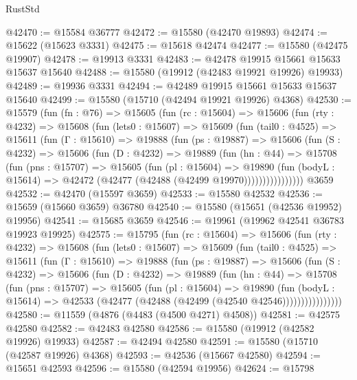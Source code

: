 \begin{lexlean}{RustStd}
\begin{coremodule}
@42470 := @15584 @36777
@42472 := @15580 (@42470 @19893)
@42474 := @15622 (@15623 @3331)
@42475 := @15618 @42474
@42477 := @15580 (@42475 @19907)
@42478 := @19913 @3331
@42483 := @42478 @19915 @15661 @15633 @15637 @15640
@42488 := @15580 (@19912 (@42483 @19921 @19926) @19933)
@42489 := @19936 @3331
@42494 := @42489 @19915 @15661 @15633 @15637 @15640
@42499 := @15580 (@15710 (@42494 @19921 @19926) @4368)
@42530 := @15579
    (fun (fn : @76) =>
    @15605
      (fun (rc : @15604) =>
      @15606
        (fun (rty : @4232) =>
        @15608
          (fun (lets0 : @15607) =>
          @15609
            (fun (tail0 : @4525) =>
            @15611
              (fun (Γ : @15610) =>
              @19888
                (fun (ps : @19887) =>
                @15606
                  (fun (S : @4232) =>
                  @15606
                    (fun (D : @4232) =>
                    @19889
                      (fun (hn : @44) =>
                      @15708
                        (fun (pns : @15707) =>
                        @15605
                          (fun (pl : @15604) =>
                          @19890
                            (fun (bodyL : @15614) =>
                            @42472 (@42477 (@42488 (@42499 @19970))))))))))))))))
    @3659
@42532 := @42470 (@15597 @3659)
@42533 := @15580 @42532
@42536 := @15659 (@15660 @3659) @36780
@42540 := @15580 (@15651 (@42536 @19952) @19956)
@42541 := @15685 @3659
@42546 := @19961 (@19962 @42541 @36783 @19923 @19925)
@42575 := @15795
    (fun (rc : @15604) =>
    @15606
      (fun (rty : @4232) =>
      @15608
        (fun (lets0 : @15607) =>
        @15609
          (fun (tail0 : @4525) =>
          @15611
            (fun (Γ : @15610) =>
            @19888
              (fun (ps : @19887) =>
              @15606
                (fun (S : @4232) =>
                @15606
                  (fun (D : @4232) =>
                  @19889
                    (fun (hn : @44) =>
                    @15708
                      (fun (pns : @15707) =>
                      @15605
                        (fun (pl : @15604) =>
                        @19890
                          (fun (bodyL : @15614) =>
                          @42533 (@42477 (@42488 (@42499 (@42540 @42546))))))))))))))))
@42580 := @11559 (@4876 (@4483 (@4500 @4271) @4508))
@42581 := @42575 @42580
@42582 := @42483 @42580
@42586 := @15580 (@19912 (@42582 @19926) @19933)
@42587 := @42494 @42580
@42591 := @15580 (@15710 (@42587 @19926) @4368)
@42593 := @42536 (@15667 @42580)
@42594 := @15651 @42593
@42596 := @15580 (@42594 @19956)
@42624 := @15798

\end{coremodule}
\end{lexlean}
